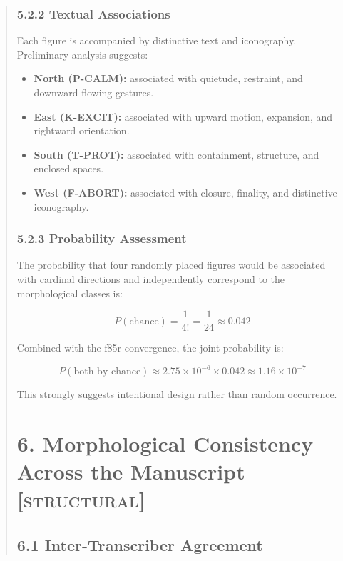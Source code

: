 \documentclass[11pt,a4paper]{article}
\begin{document}
\begin{abstract}
\subsubsection*{5.2.2 Textual Associations}

Each figure is accompanied by distinctive text and iconography. Preliminary analysis suggests:

\begin{itemize}
\item \textbf{North (P-CALM):} associated with quietude, restraint, and downward-flowing gestures.
\item \textbf{East (K-EXCIT):} associated with upward motion, expansion, and rightward orientation.
\item \textbf{South (T-PROT):} associated with containment, structure, and enclosed spaces.
\item \textbf{West (F-ABORT):} associated with closure, finality, and distinctive iconography.
\end{itemize}

\subsubsection*{5.2.3 Probability Assessment}

The probability that four randomly placed figures would be associated with cardinal directions and independently correspond to the morphological classes is:

\begin{equation}
P(\text{chance}) = \frac{1}{4!} = \frac{1}{24} \approx 0.042
\end{equation}

Combined with the f85r convergence, the joint probability is:

\begin{equation}
P(\text{both by chance}) \approx 2.75 \times 10^{-6} \times 0.042 \approx 1.16 \times 10^{-7}
\end{equation}

This strongly suggests intentional design rather than random occurrence.

\section*{6. Morphological Consistency Across the Manuscript \textsc{[structural]}}

\subsection*{6.1 Inter-Transcriber Agreement}


\end{abstract}
\end{document}
